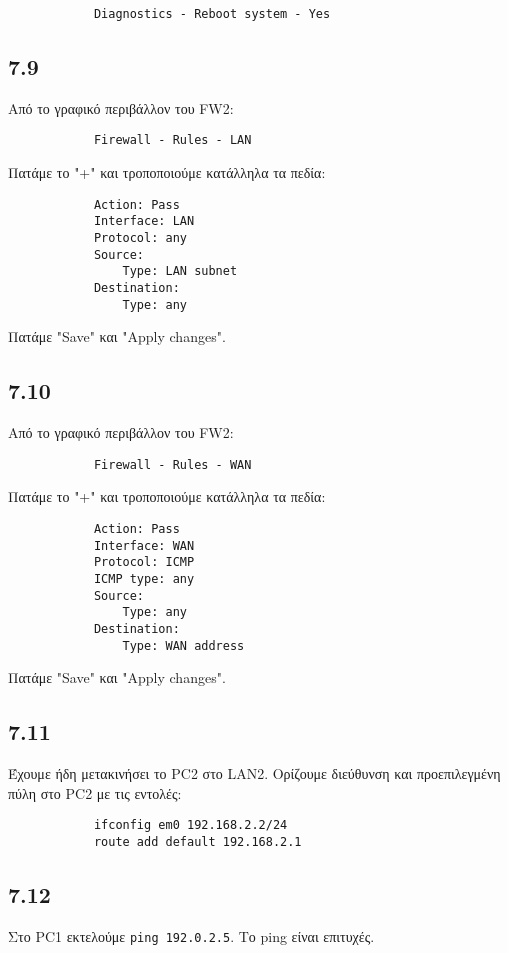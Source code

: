 \documentclass[a4paper, 12pt]{article}
\begin{document}
		\begin{verbatim}
			Diagnostics - Reboot system - Yes
		\end{verbatim}

	\subsection*{7.9}
		Από το γραφικό περιβάλλον του FW2:
		
		\begin{verbatim}
			Firewall - Rules - LAN		
		\end{verbatim}
		
		Πατάμε το "+" και τροποποιούμε κατάλληλα τα πεδία:
		
		\begin{verbatim}
			Action: Pass
			Interface: LAN
			Protocol: any
			Source: 
			    Type: LAN subnet
			Destination:
			    Type: any
		\end{verbatim}

		Πατάμε "Save" και "Apply changes".
		
	\subsection*{7.10}
		Από το γραφικό περιβάλλον του FW2:
		
		\begin{verbatim}
			Firewall - Rules - WAN
		\end{verbatim}
		
		Πατάμε το "+" και τροποποιούμε κατάλληλα τα πεδία:
		
		\begin{verbatim}
			Action: Pass
			Interface: WAN
			Protocol: ICMP
			ICMP type: any
			Source: 
			    Type: any
			Destination: 
			    Type: WAN address
		\end{verbatim}
		
		Πατάμε "Save" και "Apply changes".

	\subsection*{7.11}
		Έχουμε ήδη μετακινήσει το PC2 στο LAN2. Ορίζουμε διεύθυνση και προεπιλεγμένη πύλη στο PC2 με τις εντολές:
		
		\begin{verbatim}
			ifconfig em0 192.168.2.2/24
			route add default 192.168.2.1
		\end{verbatim}

	\subsection*{7.12}
		Στο PC1 εκτελούμε \verb|ping 192.0.2.5|. Το ping είναι επιτυχές.
\end{document}
